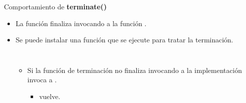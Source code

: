 \begin{frame}[t]{Comportamiento de \textbf{terminate()}}
\begin{itemize}
  \item La función  finaliza invocando a la función
        .

  \item Se puede instalar una función que se ejecute para tratar la terminación.

\begin{columns}[T]



\begin{itemize}
  \item Si la función de terminación no finaliza invocando a 
        la implementación invoca a .
    \begin{itemize}
      \item {}  vuelve.
    \end{itemize}
\end{itemize}
\end{columns}

\end{itemize}
\end{frame}
